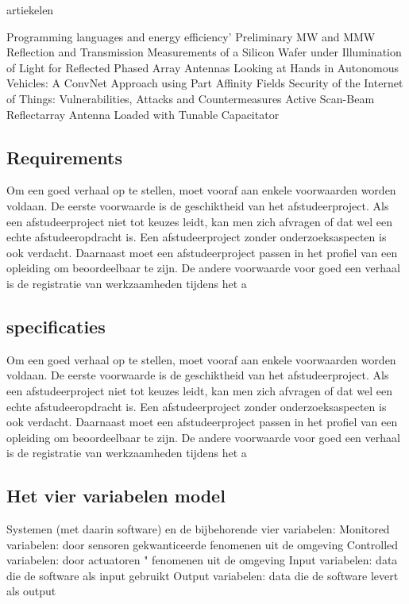 artiekelen

Programming languages and energy efficiency’
Preliminary MW and MMW Reflection and Transmission Measurements of a Silicon Wafer under Illumination of Light for Reflected Phased Array Antennas
Looking at Hands in Autonomous Vehicles: A ConvNet Approach using Part Affinity Fields
Security of the Internet of Things: Vulnerabilities, Attacks and Countermeasures
Active Scan-Beam Reflectarray Antenna Loaded with Tunable Capacitator
\subsection{Requirements}

Om een goed verhaal op te stellen, moet vooraf aan enkele voorwaarden
worden voldaan. De eerste voorwaarde is de geschiktheid van het
afstudeerproject. Als een afstudeerproject niet tot keuzes leidt, kan
men zich afvragen of dat wel een echte afstudeeropdracht is. Een
afstudeerproject zonder onderzoeksaspecten is ook verdacht. Daarnaast
moet een afstudeerproject passen in het profiel van een opleiding om
beoordeelbaar te zijn. De andere voorwaarde voor goed een verhaal is
de registratie van werkzaamheden tijdens het a
\subsection{specificaties}

Om een goed verhaal op te stellen, moet vooraf aan enkele voorwaarden
worden voldaan. De eerste voorwaarde is de geschiktheid van het
afstudeerproject. Als een afstudeerproject niet tot keuzes leidt, kan
men zich afvragen of dat wel een echte afstudeeropdracht is. Een
afstudeerproject zonder onderzoeksaspecten is ook verdacht. Daarnaast
moet een afstudeerproject passen in het profiel van een opleiding om
beoordeelbaar te zijn. De andere voorwaarde voor goed een verhaal is
de registratie van werkzaamheden tijdens het a
\subsection{Het vier variabelen model}

Systemen (met daarin software) en de bijbehorende vier variabelen:
Monitored variabelen: door sensoren gekwanticeerde
fenomenen uit de omgeving
Controlled variabelen: door actuatoren \bestuurde"
fenomenen uit de omgeving
Input variabelen: data die de software als input gebruikt
Output variabelen: data die de software levert als output

